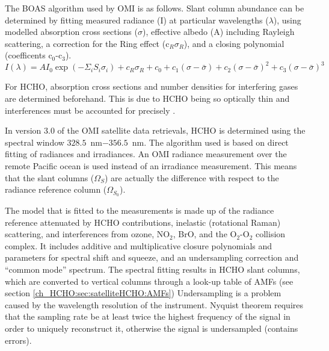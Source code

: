     The BOAS algorithm used by OMI is as follows.
    Slant column abundance can be determined by fitting measured radiance (I) at particular wavelengths ($\lambda$), using modelled absorption cross sections ($\sigma$), effective albedo (A) including Rayleigh scattering, a correction for the Ring effect (c$_R\sigma_R$), and a closing polynomial (coefficents c$_0$-c$_3$).
    \begin{equation}
      \label{ch_HCHO:eqn:BOAS_HCHO}
      I(\lambda)  = A I_0 \exp {\left( - \Sigma_i S_i \sigma_i \right) } + c_R\sigma_R + c_0 + c_1(\sigma-\bar{\sigma}) + c_2(\sigma - \bar{\sigma})^2 + c_3(\sigma - \bar{\sigma})^3 
    \end{equation}
    
    For HCHO, absorption cross sections and number densities for interfering gases are determined beforehand.
    This is due to HCHO being so optically thin and interferences must be accounted for precisely \citep{Chance2002}.
    
    In version 3.0 of the OMI satellite data retrievals, HCHO is determined using the spectral window $328.5$~nm$ - 356.5$~nm. 
    The algorithm used is based on direct fitting of radiances and irradiances.
    An OMI radiance measurement over the remote Pacific ocean is used instead of an irradiance measurement.
    This means that the slant columns ($\Omega_S$) are actually the difference with respect to the radiance reference column ($\Omega_{S_0}$).
    
    The model that is fitted to the measurements is made up of the radiance reference attenuated by HCHO contributions, inelastic (rotational Raman) scattering, and interferences from ozone, NO$_2$, BrO, and the O$_2$-O$_2$ collision complex.
    It includes additive and multiplicative closure polynomials and parameters for spectral shift and squeeze, and an undersampling correction and ``common mode'' spectrum.
    The spectral fitting results in HCHO slant columns, which are converted to vertical columns through a look-up table of AMFs (see section \ref{ch_HCHO:sec:satelliteHCHO:AMFs})
    Undersampling is a problem caused by the wavelength resolution of the instrument.
    Nyquist theorem requires that the sampling rate be at least twice the highest frequency of the signal in order to uniquely reconstruct it, otherwise the signal is undersampled (contains errors).
    
